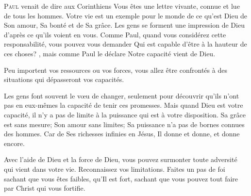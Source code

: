 \jrnlmonth





\lettrine{P}{aul} venait de dire aux Corinthiens\frcolon{} 
 \Og Vous êtes une lettre vivante, connue et lue de tous les hommes. \Fg{}
 Votre vie est un exemple pour le monde de ce qu'est Dieu \ocadr de Son amour,
 Sa bonté et de Sa grâce.
 Les gens se forment une impression de Dieu d'après ce qu'ils voient en vous.
 Comme Paul, quand vous considérez cette responsabilité, 
 vous pouvez vous demander\frcolon{} 
 \Og Qui est capable d'être à la hauteur de ces choses? \Fg{},
 mais  comme Paul le déclare\frcolon{} 
 \Og Notre capacité vient de Dieu. \Fg{}

Peu importent vos ressources ou vos forces,
 vous allez être confrontés à des situations qui dépasseront vos capacités.


Les gens font souvent le v\oe{}u de changer, seulement pour découvrir
 qu'ils n'ont pas en eux-mêmes la capacité de tenir ces promesses.
 Mais quand Dieu est votre capacité, il n'y a pas de limite à la puissance
 qui est à votre disposition.
 Sa grâce est sans mesure; Son amour sans limites;
 Sa puissance n'a pas de bornes connues des hommes.
 Car de Ses richesses infinies en Jésus, Il donne et donne, et donne encore.

Avec l'aide de Dieu et la force de Dieu, vous pouvez surmonter
 toute adversité qui vient dans votre vie. Reconnaissez vos limitations.
 Faites un pas de foi sachant que vous êtes faibles, qu'Il est fort,
 sachant que vous pouvez tout faire par Christ qui vous fortifie.

\dvrule



